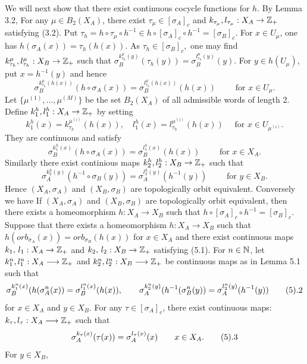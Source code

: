 We will next show that there exist continuous cocycle functions
for $h$. 
By Lemma 3.2, 
For any $\mu \in B_2(X_A)$,
there exist $\tau_\mu \in [\sigma_A]_c$
and
$k_{\tau_\mu}, l_{\tau_\mu}: X_A \rightarrow { {\Bbb Z}_+ }$
satisfying (3.2).
Put 
$
\tau_h = h \circ \tau_\mu \circ h^{-1} \in h\circ [\sigma_A]_c \circ h^{-1} = [\sigma_B]_c.
$
For $ x \in U_\mu$, one has
$
h(\sigma_A(x)) = \tau_h(h(x)).
$
As 
$
\tau_h \in [\sigma_B]_c,
$
one may find 
$k_{\tau_h}^\mu, l_{\tau_h}^\mu: X_B \rightarrow { {\Bbb Z}_+ }$
such that
 $\sigma_B^{k_{\tau_h}^\mu(y)}(\tau_h(y)) = 
\sigma_B^{l_{\tau_h}^\mu(y)}(y).
$
For $y\in h(U_\mu)$, put
$x = h^{-1}(y)$
and hence
$$
\sigma_B^{k_{\tau_h}^\mu(h(x))}(h \circ \sigma_A(x)) = 
\sigma_B^{l_{\tau_h}^\mu(h(x))}(h(x))\qquad
\text{ for } x \in U_\mu.
$$
Let 
$\{ \mu^{(1)}, \dots, \mu^{(M)} \} $
be the set $B_2(X_A)$
of all admissible words of length $2$.
Define 
$k_1^h,l_1^h : X_A \rightarrow { {\Bbb Z}_+ }$
by setting
$$
k_1^h(x) = k_{\tau_h}^{\mu^{(i)}}(h(x)),\quad
l_1^h(x) = l_{\tau_h}^{\mu^{(i)}}(h(x))
\quad \text{ for } x \in U_{\mu^{(i)}}.
$$
They are continuous and satisfy 
$$
\sigma_B^{k_1^h(x)}(h \circ \sigma_A(x)) =
\sigma_B^{l_1^h(x)}(h(x)) 
\qquad
\text{ for } x \in X_A.
$$
Similarly there exist 
continious maps
$k_2^h,l_2^h : X_B \rightarrow { {\Bbb Z}_+ }$
such that
$$
\sigma_A^{k_2^h(y)}(h^{-1} \circ \sigma_B(y)) =
\sigma_A^{l_2^h(y)}(h^{-1}(y)) 
\qquad
\text{ for  } y \in X_B.
$$
Hence
$(X_A, \sigma_A)$ and  
$(X_B, \sigma_B)$
are topologically orbit equivalent.
\enddemo 
Conversely we have
If $(X_A, \sigma_A)$ and  
$(X_B, \sigma_B)$
are topologically orbit equivalent,
then there exists a homeomorphism
$h:X_A \longrightarrow X_B$
such that
$ h \circ [\sigma_A]_c \circ h^{-1} = [\sigma_B]_c$.
\endproclaim
{}
Suppose that 
there exists a homeomorphism 
$h:X_A \rightarrow X_B$ such that 
$h(orb_{\sigma_A}(x)) = orb_{\sigma_B}(h(x))$ for $x \in X_A$
and
there exist 
continuous maps
$k_1,\, l_1:X_A \rightarrow { {\Bbb Z}_+ }$
and
$k_2,\, l_2:X_B \rightarrow { {\Bbb Z}_+ }$
satisfying (5.1).
For $n \in {\Bbb N}$,
let 
$k_1^n, l_1^n:X_A \longrightarrow { {\Bbb Z}_+ }$
and 
$k_2^n, l_2^n:X_B \longrightarrow { {\Bbb Z}_+ }$
be continuous maps as in Lemma 5.1 such that
$$
\sigma_B^{k_1^n(x)} (h(\sigma_A^n(x)) = \sigma_B^{l_1^n(x)}(h(x)),
\qquad
\sigma_A^{k_2^n(y)} (h^{-1}(\sigma_B^n(y)) = \sigma_A^{l_2^n(y)}(h^{-1}(y)) 
\tag 5.2
$$
for $x \in X_A$ and $y \in X_B$.
For any $\tau \in [\sigma_A]_c$, 
there exist continuous maps:
$k_\tau, l_\tau : X_A \longrightarrow { {\Bbb Z}_+ }$
such that
$$
\sigma_A^{k_\tau(x)}(\tau(x)) = \sigma_A^{l_\tau(x)}(x)
\qquad
x \in X_A. \tag 5.3
$$
For $ y \in X_B$,
